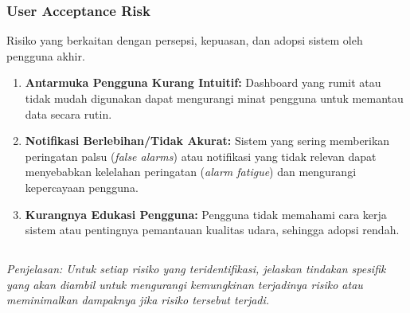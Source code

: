 \documentclass{elsinta}
\begin{document}
\subsubsection*{User Acceptance Risk}
Risiko yang berkaitan dengan persepsi, kepuasan, dan adopsi sistem oleh pengguna akhir.
\begin{enumerate}
    \item \textbf{Antarmuka Pengguna Kurang Intuitif:} Dashboard yang rumit atau tidak mudah digunakan dapat mengurangi minat pengguna untuk memantau data secara rutin.
    \item \textbf{Notifikasi Berlebihan/Tidak Akurat:} Sistem yang sering memberikan peringatan palsu (\emph{false alarms}) atau notifikasi yang tidak relevan dapat menyebabkan kelelahan peringatan (\emph{alarm fatigue}) dan mengurangi kepercayaan pengguna.
    \item \textbf{Kurangnya Edukasi Pengguna:} Pengguna tidak memahami cara kerja sistem atau pentingnya pemantauan kualitas udara, sehingga adopsi rendah.
\end{enumerate}

\subsection{\RiskMitigationTitle}
\textit{Penjelasan: Untuk setiap risiko yang teridentifikasi, jelaskan tindakan spesifik yang akan diambil untuk mengurangi kemungkinan terjadinya risiko atau meminimalkan dampaknya jika risiko tersebut terjadi.}
\end{document}
